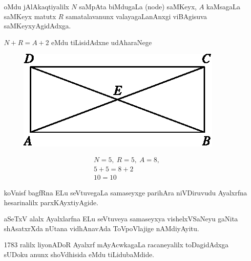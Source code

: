oMdu jAlAkaqtiyalilx $N$ saMpAta biMdugaLa {\rm (node)} saMKeyx, $A$ kaMsagaLa saMKeyx matutx $R$ samatalavanunx valayagaLanAnxgi viBAgisuva saMKeyxyAgidAdxga.

$N+R=A+2$ eMdu tiLisidAdxne udAharaNege
\begin{figure}[H]
\begin{minipage}[c]{4cm}
\centering
\includegraphics{src/figures/m_149.eps}
\end{minipage}
\qquad\qquad 
\begin{minipage}[c]{4cm}
\begin{gather*}
N = 5, \; R=5, \; A = 8, \\
5+5 = 8+2\\
10 = 10
\end{gather*}
\end{minipage}
\end{figure}

koVnisf bagfRna ELu seVtuvegaLa samaseyxge parihAra niVDiruvudu Ayalxrfna hesarinalilx parxKAyxtiyAgide.

aSeTxV alalx Ayalxlarfna ELu seVtuveya samaseyxya vishelxVSaNeyu gaNita shAsatxrXda nUtana vidhAnavAda ToVpoVlajige nAMdiyAyitu.

{\rm 1783} ralilx liyonADoR Ayalxrf mAyAcwkagaLa racaneyalilx toDagidAdxga sUDoku anunx shoVdhisida eMdu tiLidubaMdide.

